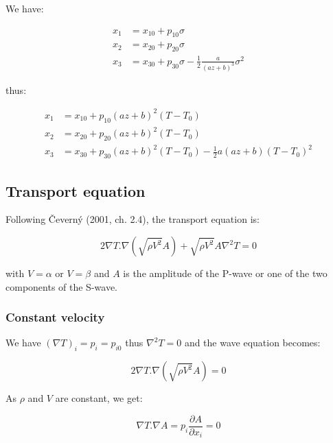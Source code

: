\documentclass[workdone.tex]{subfiles}
\begin{document}
We have:

\begin{equation}
\begin{split}
x_1 & = x_{10} + p_{10} \sigma \\
x_2 & = x_{20} + p_{20} \sigma \\
x_3 & = x_{30} + p_{30} \sigma - \frac{1}{2} \frac{a}{(a z + b)^3} \sigma^2
\end{split}
\end{equation}

thus:

\begin{equation}
\begin{split}
x_1 & = x_{10} + p_{10} (a z + b)^2 (T - T_0) \\
x_2 & = x_{20} + p_{20} (a z + b)^2 (T - T_0) \\
x_3 & = x_{30} + p_{30} (a z + b)^2 (T - T_0) - \frac{1}{2} a (a z + b) (T - T_0)^2
\end{split}
\end{equation}

\subsection{Transport equation}

Following \v Cevern\'y (2001, ch. 2.4), the transport equation is:

\begin{equation}
2 \nabla T . \nabla (\sqrt{\rho V^2} A) + \sqrt{\rho V^2} A \nabla^2 T = 0
\end{equation}

with $V = \alpha$ or $V= \beta$ and $A$ is the amplitude of the P-wave or one of the two components of the S-wave.

\subsubsection{Constant velocity}

We have $(\nabla T)_i = p_i = p_{i0}$ thus $\nabla^2 T = 0$ and the wave equation becomes:

\begin{equation}
2 \nabla T . \nabla (\sqrt{\rho V^2} A) = 0
\end{equation}

As $\rho$ and $V$ are constant, we get:

\begin{equation}
\nabla T . \nabla A = p_i \frac{\partial A}{\partial x_i} = 0
\end{equation}
\end{document}
